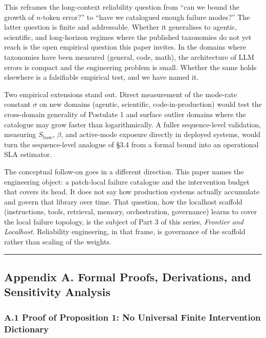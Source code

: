\documentclass[
]{article}
\begin{document}
This reframes the long-context reliability question from ``can we bound
the growth of \(n\)-token error?'' to ``have we catalogued enough
failure modes?'' The latter question is finite and addressable. Whether
it generalises to agentic, scientific, and long-horizon regimes where
the published taxonomies do not yet reach is the open empirical question
this paper invites. In the domains where taxonomies have been measured
(general, code, math), the architecture of LLM errors is compact and the
engineering problem is small. Whether the same holds elsewhere is a
falsifiable empirical test, and we have named it.

Two empirical extensions stand out. Direct measurement of the mode-rate
constant \(\sigma\) on new domains (agentic, scientific,
code-in-production) would test the cross-domain generality of Postulate
1 and surface outlier domains where the catalogue may grow faster than
logarithmically. A fuller sequence-level validation, measuring
\(S_{\text{base}}\), \(\beta\), and active-mode exposure directly in
deployed systems, would turn the sequence-level analogue of §3.4 from a
formal bound into an operational SLA estimator.

The conceptual follow-on goes in a different direction. This paper names
the engineering object: a patch-local failure catalogue and the
intervention budget that covers its head. It does not say how production
systems actually accumulate and govern that library over time. That
question, how the localhost scaffold (instructions, tools, retrieval,
memory, orchestration, governance) learns to cover the local failure
topology, is the subject of Part 3 of this series, \emph{Frontier and
Localhost}. Reliability engineering, in that frame, is governance of the
scaffold rather than scaling of the weights.

\begin{center}\rule{0.5\linewidth}{0.5pt}\end{center}

\subsection{Appendix A. Formal Proofs, Derivations, and Sensitivity
Analysis}\label{appendix-a.-formal-proofs-derivations-and-sensitivity-analysis}

\subsubsection{A.1 Proof of Proposition 1: No Universal Finite
Intervention
Dictionary}\label{a.1-proof-of-proposition-1-no-universal-finite-intervention-dictionary}
\end{document}
